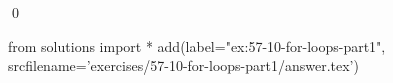 
\begin{ex}
  \label{ex:57-10-for-loops-part1}
  
  \qed
\end{ex}
\begin{python0}
from solutions import *
add(label="ex:57-10-for-loops-part1",
    srcfilename='exercises/57-10-for-loops-part1/answer.tex')
\end{python0}
